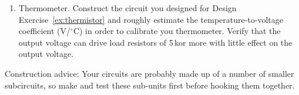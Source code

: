\documentclass{article}
\begin{document}
\begin{enumerate}
\item Thermometer.
Construct the circuit you designed for Design Exercise~\ref{ex:thermistor} and roughly estimate the temperature-to-voltage coefficient (V/$^\circ$C)  in order to calibrate you thermometer. Verify that the output voltage can drive load resistors of 5\,k\Ohm or more with little effect on the output voltage.
\end{enumerate}

Construction advice: Your circuits are probably made up of a number of smaller subcircuits, so make and test these sub-units first before hooking them together.
\end{document}
